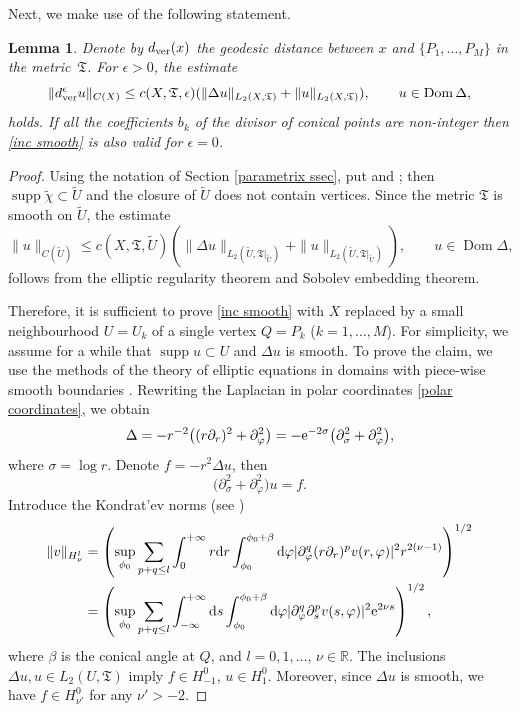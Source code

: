 \documentclass[pdftex]{sigma}
\numberwithin{equation}{section}
\newtheorem{Lemma}[Theorem]{Lemma}
\theoremstyle{definition}
\begin{document}
Next, we make use of the following statement.
\begin{Lemma}
Denote by $d_{\rm ver}(x)$ the geodesic distance between $x$ and $\{P_1,\dots,P_M\}$ in the metric~$\mathfrak{T}$. For $\epsilon>0$, the estimate
\begin{equation}
\label{inc smooth}
\|d_{\rm ver}^{\epsilon}u\|_{C(X)}\le c(X,\mathfrak{T},\epsilon)(\|\Delta u\|_{L_2(X,\mathfrak{T})}+\|u\|_{L_2(X,\mathfrak{T})}), \qquad u\in \operatorname{Dom}\Delta,
\end{equation}
holds. If all the coefficients $b_k$ of the divisor of conical points are non-integer then {\rm\eqref{inc smooth}} is also valid for $\epsilon=0$.
\end{Lemma}
\begin{proof}
Using the notation of Section \ref{parametrix ssec}, put  and ; then ${\operatorname{supp}\tilde{\chi}\!\subset\!\tilde{U}}$ and the closure of $\tilde{U}$ does not contain vertices. Since the metric $\mathfrak{T}$ is smooth on $\tilde{U}$, the estimate%
\begin{equation}\label{inc smooth outside vert}
\|u\|_{C(\tilde{U})}\le c(X,\mathfrak{T},\tilde{U})(\|\Delta u\|_{L_2(\tilde{U},\mathfrak{T}|_{\tilde{U}})}+\|u\|_{L_2(\tilde{U},\mathfrak{T}|_{\tilde{U}})}), \qquad u\in \operatorname{Dom}\Delta,
\end{equation}
follows from the elliptic regularity theorem and Sobolev embedding theorem.

Therefore, it is sufficient to prove \eqref{inc smooth} with $X$ replaced by a small neighbourhood ${U=U_k}$ of a single vertex $Q=P_k$ ($k=1,\dots,M$). For simplicity, we assume for a while that $\operatorname{supp}u\subset U$ and $\Delta u$ is smooth. To prove the claim, we use the methods of the theory of elliptic equations in domains with piece-wise smooth boundaries \cite{Kon,NP}. Rewriting the Laplacian in polar coordinates \eqref{polar coordinates}, we obtain
\[\Delta=-r^{-2}\bigl((r\partial_r)^2+\partial_\varphi^2\bigr)=-{\rm e}^{-2\sigma}\bigl(\partial_\sigma^2+\partial_\varphi^2\bigr),\]
where $\sigma=\log r$. Denote $f=-r^2\Delta u$, then
\begin{equation}
\label{ellip eq 1}
\bigl(\partial_\sigma^2+\partial_\varphi^2\bigr)u=f.
\end{equation}
Introduce the Kondrat'ev norms (see \cite{Kon})
\begin{align*}%
\|v\|_{H_\nu^l}&=\left(\sup_{\phi_0}\sum_{p+q\le l}\int_{0}^{+\infty}r{\rm d}r\int_{\phi_0}^{\phi_0+\beta} {\rm d}\varphi |\partial^q_\varphi(r\partial_r)^p v(r,\varphi)|^2 r^{2(\nu-1)}\right)^{1/2}\\
&=\left(\sup_{\phi_0}\sum_{p+q\le l}\int_{-\infty}^{+\infty}{\rm d}s \int_{\phi_0}^{\phi_0+\beta} {\rm d}\varphi |\partial^q_\varphi\partial_s^p v(s,\varphi)|^2 {\rm e}^{2\nu s}\right)^{1/2},
\end{align*}
where $\beta$ is the conical angle at $Q$, and $l=0,1,\dots$, $\nu\in\mathbb{R}$. The inclusions $\Delta u,u\in L_2(U,\mathfrak{T})$ imply $f\in H^0_{-1}$, $u\in H^0_1$. Moreover, since $\Delta u$ is smooth, we have $f\in H^0_{\nu'}$ for any $\nu'>-2$.


\end{proof}
\end{document}
